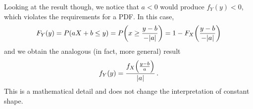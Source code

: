 \begin{ex}
Looking at the result though, we notice that $a < 0$ would produce $f_Y(y) < 0$, which violates the requirements for a PDF. In this case,\footnotemark{}
\begin{equation*}
F_Y(y) = P(a X + b \leq y) = P\qty(x \geq \frac{y - b}{- \abs{a}}) = 1 - F_X\qty(\frac{y - b}{- \abs{a}})
\end{equation*}
and we obtain the analogous (in fact, more general) result
\begin{equation*}
f_Y(y) = \frac{f_X\qty(\frac{y - b}{a})}{\abs{a}} \, .
\end{equation*}
This is a mathematical detail and does not change the interpretation of constant shape.

\end{ex}


